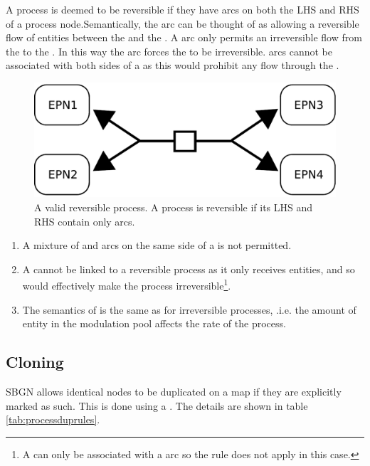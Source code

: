 A process is deemed to be reversible if they have  arcs on both the LHS and RHS of a process node.Semantically, the  arc can be thought of as allowing a reversible flow of entities between the  and the . A  arc only permits an irreversible flow from the  to the . In this way the  arc forces the  to be irreversible.  arcs cannot be associated with both sides of a  as this would prohibit any flow through the .

\begin{figure}[H]
  \centering
  \includegraphics[scale = 0.4]{images/reversible_process}
  \caption{A valid reversible process. A process is reversible if its LHS and RHS contain only  arcs.}
  \label{fig:process-reversibility}
\end{figure}
 
\begin{enumerate}
\item  A mixture of  and  arcs on the same side of a  is not permitted.
\item A  cannot be linked to a reversible process as it only receives entities, and so would effectively make the process irreversible\footnote{A  can only be associated with a  arc so the rule does not apply in this case.}.
\item The semantics of  is the same as for irreversible processes, .i.e. the amount of entity in the modulation pool affects the rate of the process.
\end{enumerate}

 
\subsection{Cloning}

SBGN allows identical nodes to be duplicated on a map if they are
explicitly marked as such. This is done using a . The details are shown in table \ref{tab:processduprules}.


